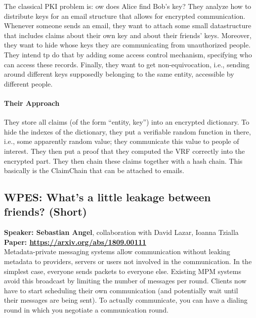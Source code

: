 \documentclass{article}
\begin{document}
The classical PKI problem is: ow does Alice find Bob's key?
They analyze how to distribute keys for an email structure that allows for encrypted communication. Whenever someone sends an email, they want to attach some small datastructure that includes claims about their own key and about their friends' keys. Moreover, they want to hide whose keys they are communicating from unauthorized people. They intend tp do that by adding some access control mechanism, specifying who can access these records. Finally, they want to get non-equivocation, i.e., sending around different keys supposedly belonging to the same entity, accessible by different people.

\paragraph{Their Approach}
They store all claims (of the form ``entity, key'') into an encrypted dictionary. To hide the indexes of the dictionary, they put a verifiable random function in there, i.e., some apparently random value; they communicate this value to people of interest. They then put a proof that they computed the VRF correctly into the encrypted part. They then chain these claims together with a hash chain. This basically is the ClaimChain that can be attached to emails.


\subsection{WPES: What's a little leakage between friends? (Short)}
\noindent\textbf{Speaker: Sebastian Angel}, collaboration with David Lazar, Ioanna Tzialla\\
\noindent\textbf{Paper: \url{https://arxiv.org/abs/1809.00111}}\\

Metadata-private messaging systems allow communication without leaking metadata to providers, servers or users not involved in the communication. In the simplest case, everyone sends packets to everyone else. Existing MPM systems avoid this broadcast by limiting the number of messages per round. Clients now have to start scheduling their own communication (and potentially wait until their messages are being sent). To actually communicate, you can have a dialing round in which you negotiate a communication round.
\end{document}
